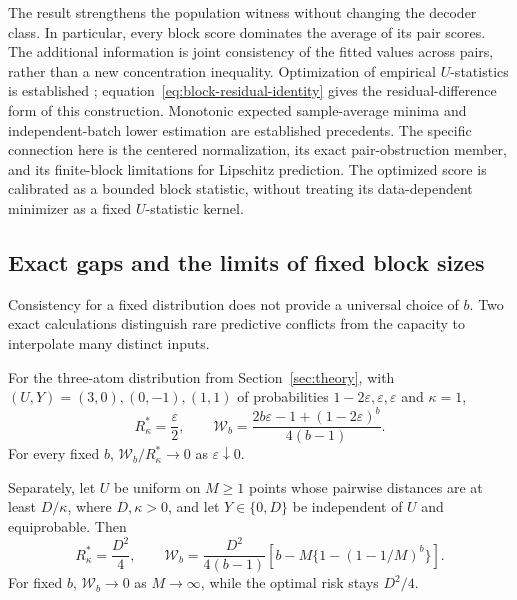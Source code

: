 The result strengthens the population witness without changing the decoder
class. In particular, every block score dominates the average of its
pair scores. The additional information is joint consistency of the fitted
values across pairs, rather than a new concentration inequality.
Optimization of empirical $U$-statistics is established
\citep{clemencon2016scaling}; equation~\eqref{eq:block-residual-identity}
gives the residual-difference form of this construction. Monotonic expected
sample-average minima \citep{mak1999montecarlo} and independent-batch
lower estimation \citep{linderoth2006empirical} are established precedents.
The specific connection here is the centered normalization, its exact
pair-obstruction member, and its finite-block limitations for Lipschitz
prediction. The optimized score is calibrated as a bounded block statistic,
without treating its data-dependent minimizer as a fixed $U$-statistic kernel.

\subsection{Exact gaps and the limits of fixed block sizes}

Consistency for a fixed distribution does not provide a universal choice
of $b$. Two exact calculations distinguish rare predictive conflicts from
the capacity to interpolate many distinct inputs.

\begin{proposition}
\label{prop:block-rare}
For the three-atom distribution from Section~\ref{sec:theory}, with
$(U,Y)=(3,0),(0,-1),(1,1)$ of probabilities
$1-2\varepsilon,\varepsilon,\varepsilon$ and $\kappa=1$,
\begin{equation}
 R^*_\kappa=\frac\varepsilon2,
 \qquad
 \mathcal{W}_b=\frac{2b\varepsilon-1+(1-2\varepsilon)^b}{4(b-1)}.
 \label{eq:block-rare-exact}
\end{equation}
For every fixed $b$, $\mathcal{W}_b/R^*_\kappa\to0$ as
$\varepsilon\downarrow0$.

Separately, let $U$ be uniform on $M\geq1$ points whose pairwise
distances are at least $D/\kappa$, where $D,\kappa>0$, and let
$Y\in\{0,D\}$ be independent of $U$ and equiprobable. Then
\begin{equation}
 R^*_\kappa=\frac{D^2}{4},
 \qquad
 \mathcal{W}_b=\frac{D^2}{4(b-1)}
       \left[b-M\{1-(1-1/M)^b\}\right].
 \label{eq:block-occupancy}
\end{equation}
For fixed $b$, $\mathcal{W}_b\to0$ as $M\to\infty$, while the optimal risk
stays $D^2/4$.
\end{proposition}

